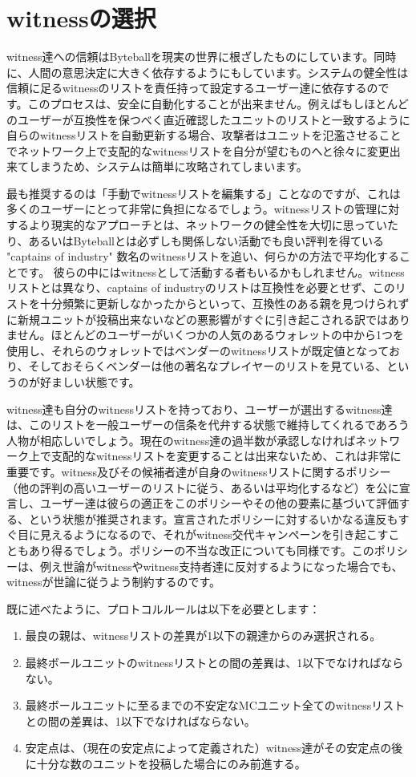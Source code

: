 \documentclass[a4paper, dvipdfmx]{jsarticle}
\begin{document}
\section{witnessの選択}
witness達への信頼はByteballを現実の世界に根ざしたものにしています。同時に、人間の意思決定に大きく依存するようにもしています。システムの健全性は信頼に足るwitnessのリストを責任持って設定するユーザー達に依存するのです。このプロセスは、安全に自動化することが出来ません。例えばもしほとんどのユーザーが互換性を保つべく直近確認したユニットのリストと一致するように自らのwitnessリストを自動更新する場合、攻撃者はユニットを氾濫させることでネットワーク上で支配的なwitnessリストを自分が望むものへと徐々に変更出来てしまうため、システムは簡単に攻略されてしまいます。

最も推奨するのは「手動でwitnessリストを編集する」ことなのですが、これは多くのユーザーにとって非常に負担になるでしょう。witnessリストの管理に対するより現実的なアプローチとは、ネットワークの健全性を大切に思っていたり、あるいはByteballとは必ずしも関係しない活動でも良い評判を得ている "captains of industry" 数名のwitnessリストを追い、何らかの方法で平均化することです。 彼らの中にはwitnessとして活動する者もいるかもしれません。witnessリストとは異なり、captains of industryのリストは互換性を必要とせず、このリストを十分頻繁に更新しなかったからといって、互換性のある親を見つけられずに新規ユニットが投稿出来ないなどの悪影響がすぐに引き起こされる訳ではありません。ほとんどのユーザーがいくつかの人気のあるウォレットの中から1つを使用し、それらのウォレットではベンダーのwitnessリストが既定値となっており、そしておそらくベンダーは他の著名なプレイヤーのリストを見ている、というのが好ましい状態です。

witness達も自分のwitnessリストを持っており、ユーザーが選出するwitness達は、このリストを一般ユーザーの信条を代弁する状態で維持してくれるであろう人物が相応しいでしょう。現在のwitness達の過半数が承認しなければネットワーク上で支配的なwitnessリストを変更することは出来ないため、これは非常に重要です。witness及びその候補者達が自身のwitnessリストに関するポリシー（他の評判の高いユーザーのリストに従う、あるいは平均化するなど）を公に宣言し、ユーザー達は彼らの適正をこのポリシーやその他の要素に基づいて評価する、という状態が推奨されます。宣言されたポリシーに対するいかなる違反もすぐ目に見えるようになるので、それがwitness交代キャンペーンを引き起こすこともあり得るでしょう。ポリシーの不当な改正についても同様です。このポリシーは、例え世論がwitnessやwitness支持者達に反対するようになった場合でも、witnessが世論に従うよう制約するのです。

既に述べたように、プロトコルルールは以下を必要とします：
\begin{enumerate}
    \item 最良の親は、witnessリストの差異が1以下の親達からのみ選択される。
    \item 最終ボールユニットのwitnessリストとの間の差異は、1以下でなければならない。
    \item 最終ボールユニットに至るまでの不安定なMCユニット全てのwitnessリストとの間の差異は、1以下でなければならない。
    \item 安定点は、（現在の安定点によって定義された）witness達がその安定点の後に十分な数のユニットを投稿した場合にのみ前進する。
\end{enumerate}
\end{document}
